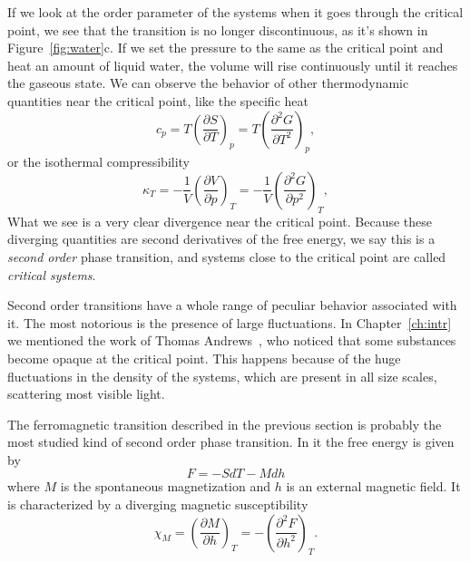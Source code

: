 If we look at the order parameter of the systems when it goes through the
critical point, we see that the transition is no longer discontinuous, as it's
shown in Figure~\ref{fig:water}c. If we set the pressure to the same as the
critical point and heat an amount of liquid water, the volume will rise
continuously until it reaches the gaseous state. We can observe the behavior of
other thermodynamic quantities near the critical point, like the specific heat
\begin{equation}
    c_p=T{\left(\frac{\partial S}{\partial T}\right)}_{p}=
    T{\left(\frac{\partial^{2}G}{\partial T^{2}}\right)}_{p},
\end{equation}
or the isothermal compressibility
\begin{equation}
    \kappa_T=-\frac{1}{V}{\left(\frac{\partial V}{\partial p}\right)}_{T}=
    -\frac{1}{V}{\left(\frac{\partial^{2}G}{\partial p^{2}}\right)}_{T},
\end{equation}
What we see is a very clear divergence near the critical point. Because these
diverging quantities are second derivatives of the free energy, we say this is
a \textit{second order} phase transition, and systems close to the critical
point are called \textit{critical systems}.

Second order transitions have a whole range of peculiar behavior associated
with it. The most notorious is the presence of large fluctuations. In
Chapter~\ref{ch:intr} we mentioned the work of Thomas
Andrews~\cite{Andrews1869}, who noticed that some substances become opaque at
the critical point. This happens because of the huge fluctuations in the
density of the systems, which are present in all size scales, scattering most
visible light.

The ferromagnetic transition described in the previous section is probably the
most studied kind of second order phase transition. In it the free energy is
given by
\begin{equation}
    F = -SdT-Mdh
\end{equation}
where $M$ is the spontaneous magnetization and $h$ is an external magnetic
field. It is characterized by a diverging magnetic susceptibility
\begin{equation}
    \chi_{M}=
    {\left(\frac{\partial M}{\partial h}\right)}_{T}=
    -{\left(\frac{\partial^{2}F}{\partial h^{2}}\right)}_{T}.
\end{equation}

